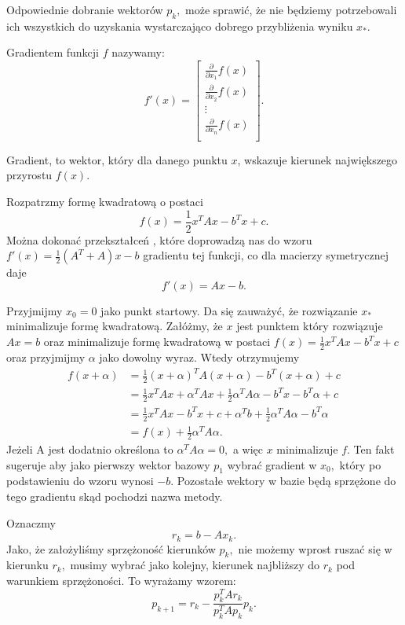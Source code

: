 \documentclass[a4paper,12pt]{book} %
\begin{document}
Odpowiednie dobranie wektorów $p_k,$ może sprawić, że nie będziemy potrzebowali ich wszystkich do uzyskania wystarczająco dobrego przybliżenia wyniku $x_*.$

\begin{df}
Gradientem funkcji $f$ nazywamy:
\[
f'(x) = 
\begin{bmatrix}
\frac{\partial }{\partial x_1}f(x) \\
\frac{\partial }{\partial x_2}f(x) \\
\vdots \\
\frac{\partial }{\partial x_n}f(x) \\
\end{bmatrix}
.
\]
\end{df}
Gradient, to wektor, który dla danego punktu $x$, wskazuje kierunek największego przyrostu $f(x)$.

Rozpatrzmy formę kwadratową o postaci $$f(x) = \frac{1}{2}x^TAx - b^Tx + c.$$ Można dokonać przekształceń \cite{gradient-quadratic, gradient-quadratic2}, które
doprowadzą nas do wzoru $f'(x) = \frac{1}{2}(A^T + A)x - b$ gradientu tej funkcji, co dla macierzy symetrycznej daje
$$f'(x) = Ax - b.$$

Przyjmijmy $x_0 = 0$ jako punkt startowy. Da się zauważyć, że rozwiązanie $x_*$ minimalizuje formę kwadratową. Załóżmy, że $x$ jest punktem który rozwiązuje $Ax = b$ oraz minimalizuje formę kwadratową w postaci $f(x) = \frac{1}{2}x^TAx - b^Tx + c$ oraz przyjmijmy $\alpha$ jako dowolny wyraz. Wtedy otrzymujemy
\begin{align*}
f(x + \alpha) &= \frac{1}{2}(x + \alpha)^TA(x+\alpha)-b^T(x+\alpha)+c \\
	&= \frac{1}{2}x^TAx+\alpha^TAx+\frac{1}{2}\alpha^TA\alpha-b^Tx - b^T\alpha+c \\
	&= \frac{1}{2}x^TAx-b^Tx+c+\alpha^Tb+\frac{1}{2}\alpha^TA\alpha -b^T\alpha \\
	&= f(x) + \frac{1}{2}\alpha^TA\alpha.
\end{align*}
Jeżeli A jest dodatnio określona to $\alpha^TA\alpha = 0,$ a więc $x$ minimalizuje $f.$
Ten fakt sugeruje aby jako pierwszy wektor bazowy $p_1$ wybrać gradient w $x_0,$ który po podstawieniu do wzoru wynosi $-b.$ Pozostałe wektory w bazie będą sprzężone do tego gradientu skąd pochodzi nazwa metody. 

Oznaczmy
$$r_k = b - Ax_k.$$
Jako, że założyliśmy sprzężoność kierunków $p_k,$ nie możemy wprost ruszać się w kierunku $r_k,$ musimy wybrać jako kolejny, kierunek najbliższy do $r_k$ pod warunkiem sprzężoności. To wyrażamy wzorem:
$$p_{k+1} = r_k - \frac{p_k^TAr_k}{p_k^TAp_k}p_k.$$ 
\end{document}
